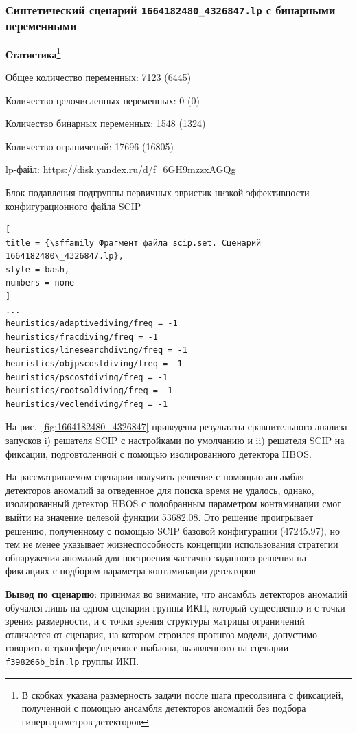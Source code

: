 \documentclass[%
	11pt,
	a4paper,
	utf8,
		]{article}
\begin{document}
\subsubsection{Синтетический сценарий \texttt{1664182480\_4326847.lp} с бинарными переменными}

\textbf{Статистика}\footnote{В скобках указана размерность задачи после шага пресолвинга с фиксацией, полученной с помощью ансамбля детекторов аномалий без подбора гиперпараметров детекторов}\vspace*{1mm}

Общее количество переменных: 7123 (6445)

Количество целочисленных переменных: 0 (0)

Количество бинарных переменных: 1548 (1324)

Количество ограничений: 17696 (16805)

lp-файл: \url{https://disk.yandex.ru/d/f_6GH9mzzxAGQg}

Блок подавления подгруппы первичных эвристик низкой эффективности конфигурационного файла SCIP
\begin{lstlisting}[
title = {\sffamily Фрагмент файла scip.set. Сценарий 1664182480\_4326847.lp},
style = bash,
numbers = none
]
...
heuristics/adaptivediving/freq = -1
heuristics/fracdiving/freq = -1
heuristics/linesearchdiving/freq = -1
heuristics/objpscostdiving/freq = -1
heuristics/pscostdiving/freq = -1
heuristics/rootsoldiving/freq = -1
heuristics/veclendiving/freq = -1
\end{lstlisting}

На рис.~\ref{fig:1664182480_4326847} приведены результаты сравнительного анализа запусков i) решателя SCIP с настройками по умолчанию и ii) решателя SCIP на фиксации, подговтоленной с помощью изолированного детектора HBOS.

На рассматриваемом сценарии получить решение с помощью ансамбля детекторов аномалий за отведенное для поиска время не удалось, однако, изолированный детектор HBOS с подобранным параметром контаминации смог выйти на значение целевой функции 53682.08. Это решение проигрывает решению, полученному с помощью SCIP базовой конфигурации (47245.97), но тем не менее указывает жизнеспособность концепции использования стратегии обнаружения аномалий для построения частично-заданного решения на фиксациях с подбором параметра контаминации детекторов.

\textbf{Вывод по сценарию}: принимая во внимание, что ансамбль детекторов аномалий обучался лишь на одном сценарии группы ИКП, который существенно и с точки зрения размерности, и с точки зрения структуры матрицы ограничений отличается от сценария, на котором строился прогнгоз модели, допустимо говорить о трансфере/переносе шаблона, выявленного на сценарии \texttt{f398266b\_bin.lp} группы ИКП.
\end{document}
